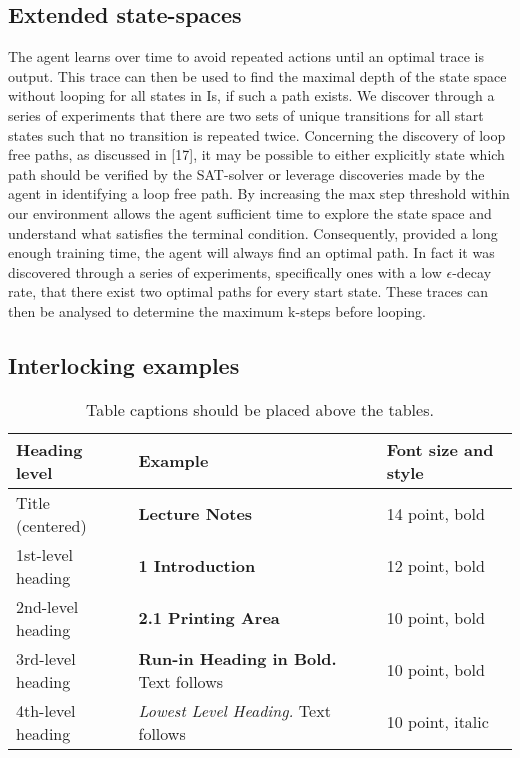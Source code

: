 \documentclass[runningheads]{llncs}
\begin{document}
\subsection{Extended state-spaces}
The agent learns over time to avoid repeated actions until an optimal trace is output.
This trace can then be used to find the maximal depth of the state space without looping
for all states in Is, if such a path exists. We discover through a series of experiments
that there are two sets of unique transitions for all start states such that no transition is
repeated twice. Concerning the discovery of loop free paths, as discussed in [17], it may
be possible to either explicitly state which path should be verified by the SAT-solver or
leverage discoveries made by the agent in identifying a loop free path. By increasing the
max step threshold within our environment allows the agent sufficient time to explore the
state space and understand what satisfies the terminal condition. Consequently, provided
a long enough training time, the agent will always find an optimal path. In fact it was
discovered through a series of experiments, specifically ones with a low $\epsilon$-decay rate, that
there exist two optimal paths for every start state. These traces can then be analysed to
determine the maximum k-steps before looping.
\subsection{Interlocking examples}





\begin{table}
\caption{Table captions should be placed above the
tables.}\label{tab1}
\begin{tabular}{|l|l|l|}
\hline
Heading level &  Example & Font size and style\\
\hline
Title (centered) &  {\Large\bfseries Lecture Notes} & 14 point, bold\\
1st-level heading &  {\large\bfseries 1 Introduction} & 12 point, bold\\
2nd-level heading & {\bfseries 2.1 Printing Area} & 10 point, bold\\
3rd-level heading & {\bfseries Run-in Heading in Bold.} Text follows & 10 point, bold\\
4th-level heading & {\itshape Lowest Level Heading.} Text follows & 10 point, italic\\
\hline
\end{tabular}
\end{table}
\end{document}
